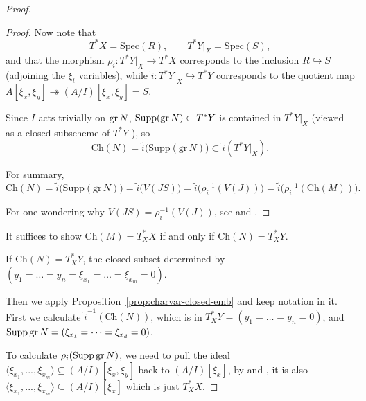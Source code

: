 \begin{proof}
\begin{proof}
        Now note that
        \[
            T^*X=\mathrm{Spec}(R),\qquad T^*Y|_X=\mathrm{Spec}(S),
        \]
        and that the morphism $\rho_i:T^*Y|_X\to T^*X$ corresponds to the inclusion $R\hookrightarrow S$
        (adjoining the $\xi_t$ variables), while $\widetilde i:T^*Y|_X\hookrightarrow T^*Y$ corresponds to the quotient map
        $A[\xi_x,\xi_y]\twoheadrightarrow (A/I)[\xi_x,\xi_y]=S$.

        Since $I$ acts trivially on $\operatorname{gr} N$, $\operatorname{Supp}(\operatorname{gr} N)\subset T^*Y$ is contained in $T^*Y|_X$ (viewed as a closed subscheme of $T^*Y$ \cite[\href{https://stacks.math.columbia.edu/tag/02RA}{Tag 02RA}]{stacks-project}), so
        \[
            \mathrm{Ch}(N)
            =\widetilde i\bigl(\mathrm{Supp}(\mathrm{gr}\,N)\bigr)
            \subset \widetilde i(T^*Y|_X).
        \]

        For summary,
        \[
            \mathrm{Ch}(N)
            =\widetilde i\bigl(\mathrm{Supp}(\mathrm{gr}\,N)\bigr)
            =\widetilde i\bigl(V(JS)\bigr)
            =\widetilde i\bigl(\rho_i^{-1}(V(J))\bigr)
            =\widetilde i\bigl(\rho_i^{-1}(\mathrm{Ch}(M))\bigr).
        \]

        For one wondering why $V(JS) = \rho_i^{-1}(V(J))$, see \cite[\href{https://stacks.math.columbia.edu/tag/05CK}{Tag 05CK}]{stacks-project} and \cite[Example~1.13]{cring-ch15-flatness}.

    \end{proof}

    It suffices to show $\mathrm{Ch}(M)=T_X^*X$ if and only if $\mathrm{Ch}(N)=T_X^*Y$.

    If $\mathrm{Ch}(N)=T_X^*Y$, the closed subset determined by $(y_1=\dots=y_n=\xi_{x_1}=\dots=\xi_{x_m}=0)$.

    Then we apply Proposition~\ref{prop:charvar-closed-emb} and keep notation in it. First we calculate $\widetilde i^{-1}(\mathrm{Ch}(N))$,
    which is in $T^*_X Y = (y_1=\dots=y_n=0)$,
    and $\operatorname{Supp} \operatorname{gr} N = (\xi_{x_1}=\dots=\xi_{x_d}=0)$.

    To calculate $\rho_i(\operatorname{Supp} \operatorname{gr} N)$, we need to pull the ideal $\langle \xi_{x_1},...,\xi_{x_m} \rangle \subseteq (A/I)[\xi_x,\xi_y]$ back to $(A/I)[\xi_x]$,
    by  \cite[\href{https://stacks.math.columbia.edu/tag/05CK}{Tag 05CK}]{stacks-project} and \cite[Example~1.13]{cring-ch15-flatness},
    it is also $\langle \xi_{x_1},...,\xi_{x_m} \rangle \subseteq (A/I)[\xi_x]$ which is just $T^*_X X$.

\end{proof}

